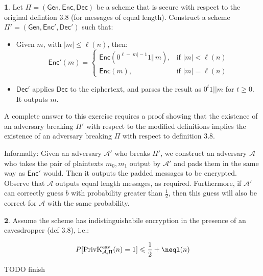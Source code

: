 \documentclass{article}
\theoremstyle{definition}
\newcommand{\abs}[1]{\left|#1\right|}
\newcommand{\Gen}{\mathsf{Gen}}
\newcommand{\Enc}{\mathsf{Enc}}
\newcommand{\Dec}{\mathsf{Dec}}
\newcommand{\Adv}{\mathcal{A}} %
\newcommand{\priveav}{\text{PrivK}_{\mathcal{A},\Pi}^\text{eav}}
\theoremstyle{definition}
\theoremstyle{definition}
\newtheorem{solution-internal}{}[subsection]
\newenvironment{solution}{
  \begin{solution-internal}
}{
  \end{solution-internal}
}
\begin{document}
\begin{solution}
  Let $\Pi = \left( \Gen, \Enc, \Dec \right)$ be a scheme that is secure with
  respect to the original defintion 3.8 (for messages of equal length).
  Construct a scheme $\Pi' = \left( \Gen, \Enc', \Dec'\right)$ such that:
  \begin{itemize}
    \item Given $m$, with $\abs{m} \leqslant \ell(n)$, then:
      \[ 
      \Enc'(m) = \left\{ 
        \begin{array}{ll}
          \Enc(0^{\ell - \abs{m} - 1} 1||m), & \text{if $\abs{m} < \ell(n)$} \\
          \Enc(m), & \text{if $\abs{m} = \ell(n)$}
        \end{array}
      \]
    \item $\Dec'$ applies $\Dec$ to the ciphertext, and parses the result as
      $0^t1||m$ for $t \geqslant 0$. It outputs $m$.
  \end{itemize}
  A complete answer to this exercise requires a proof showing that the existence
  of an adversary breaking $\Pi'$ with respect to the modified definitions
  implies the existence of an adversary breaking $\Pi$ with respect to
  definition 3.8.

  Informally: Given an adversary $\Adv'$ who breaks $\Pi'$, we construct an
  adversary $\Adv$ who takes the pair of plaintexts $m_0, m_1$ output by $\Adv'$
  and pads them in the same way as $\Enc'$ would. Then it outputs the padded
  messages to be encrypted. Observe that $\Adv$ outputs equal length messages,
  as required. Furthermore, if $\Adv'$ can correctly guess $b$ with probability
  greater than $\frac{1}{2}$, then this guess will also be correct for $\Adv$
  with the same probability.
\end{solution}
\begin{solution}
  Assume the scheme has indistinguishabile encryption in the presence of an
  eavesdropper (def 3.8), i.e.:

  \[ P[\priveav(n) = 1] \leqslant \frac{1}{2} + \neql(n) \] 

  TODO finish
\end{solution}
\end{document}
